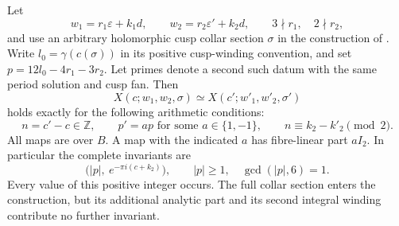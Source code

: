 \begin{proposition}[B.2.1; Proved]\label{st:B.2.1}
Let
\[
 w_1=r_1\varepsilon+k_1d,\qquad w_2=r_2\varepsilon'+k_2d,
 \qquad 3\nmid r_1,\quad 2\nmid r_2,
\]
and use an arbitrary holomorphic cusp collar section $\sigma$ in the construction of \cite[Section 6.4]{AC26}. Write $l_0=\gamma(c(\sigma))$ in its positive cusp-winding convention, and set $p=12l_0-4r_1-3r_2$. Let primes denote a second such datum with the same period solution and cusp fan. Then
\[
 X(c;w_1,w_2,\sigma)\simeq X(c';w'_1,w'_2,\sigma')
\]
holds exactly for the following arithmetic conditions:
\[
 n=c'-c\in\mathbb Z,\qquad
 p'=a p\text{ for some }a\in\{1,-1\},\qquad
 n\equiv k_2-k'_2\pmod2.
\]
All maps are over $B$. A map with the indicated $a$ has fibre-linear part $aI_2$. In particular the complete invariants are
\[
 \bigl(|p|,\ e^{-\pi i(c+k_2)}\bigr),\qquad
 |p|\ge1,\quad\gcd(|p|,6)=1.
\]
Every value of this positive integer occurs. The full collar section enters the construction, but its additional analytic part and its second integral winding contribute no further invariant.
\end{proposition}
